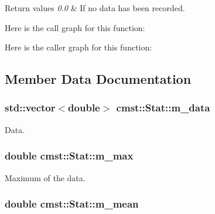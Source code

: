 \begin{DoxyRetVals}{Return values}
{\em 0.0} & If no data has been recorded. \\
\hline
\end{DoxyRetVals}


Here is the call graph for this function:




Here is the caller graph for this function:




\subsection{Member Data Documentation}
\subsubsection[{\texorpdfstring{m\_data}{m_data}}]{\setlength{\rightskip}{0pt plus 5cm}std::vector$<$double$>$ cmst::Stat::m\_data\hspace{0.3cm}{\ttfamily [private]}}\hypertarget{classcmst_1_1_stat_a8c6fad792b12d961df5ea2b091cb39f4}{}\label{classcmst_1_1_stat_a8c6fad792b12d961df5ea2b091cb39f4}


Data. 

\subsubsection[{\texorpdfstring{m\_max}{m_max}}]{\setlength{\rightskip}{0pt plus 5cm}double cmst::Stat::m\_max\hspace{0.3cm}{\ttfamily [private]}}\hypertarget{classcmst_1_1_stat_a93f52caf45b449d34c87fcbb0ebaa93e}{}\label{classcmst_1_1_stat_a93f52caf45b449d34c87fcbb0ebaa93e}


Maximum of the data. 

\subsubsection[{\texorpdfstring{m\_mean}{m_mean}}]{\setlength{\rightskip}{0pt plus 5cm}double cmst::Stat::m\_mean\hspace{0.3cm}{\ttfamily [private]}}\hypertarget{classcmst_1_1_stat_a0fc650572d2cea2bae2190188f3a03cf}{}\label{classcmst_1_1_stat_a0fc650572d2cea2bae2190188f3a03cf}


